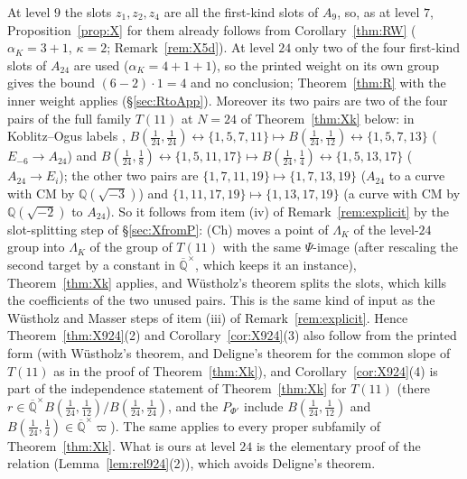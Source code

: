\documentclass[11pt]{amsart}
\theoremstyle{definition}
\newcommand{\Qb}{\overline{\mathbb{Q}}}
\newcommand{\Q}{\mathbb{Q}}
\newcommand{\vp}{\varpi}
\begin{document}
\noindent At level $9$ the slots $z_1,z_2,z_4$ are all the first-kind slots of $A_9$, so, as at level $7$,
Proposition~\ref{prop:X} for them already follows from Corollary~\ref{thm:RW} ($\alpha_K=3+1$, $\kappa=2$;
Remark~\ref{rem:X5d}). At level $24$ only two of the four first-kind slots of $A_{24}$ are used ($\alpha_K=4+1+1$), so the
printed weight on its own group gives the bound $(6-2)\cdot1=4$ and no conclusion; Theorem~\ref{thm:R} with the inner weight
applies (\S\ref{sec:RtoApp}). Moreover its two
pairs are two of the four pairs of the full family $T(11)$ at $N=24$ of Theorem~\ref{thm:Xk} below: in Koblitz--Ogus labels
\cite{KO79}, $B(\frac1{24},\frac1{24})\leftrightarrow\{1,5,7,11\}\mapsto B(\frac1{24},\frac1{12})\leftrightarrow\{1,5,7,13\}$
($E_{-6}\to A_{24}$) and $B(\frac1{24},\frac18)\leftrightarrow\{1,5,11,17\}\mapsto B(\frac1{24},\frac14)\leftrightarrow
\{1,5,13,17\}$ ($A_{24}\to E_i$); the other two pairs are $\{1,7,11,19\}\mapsto\{1,7,13,19\}$ ($A_{24}$ to a curve with CM by
$\Q(\sqrt{-3})$) and $\{1,11,17,19\}\mapsto\{1,13,17,19\}$ (a curve with CM by $\Q(\sqrt{-2})$ to $A_{24}$). So it follows
from item (iv) of Remark~\ref{rem:explicit} by the slot-splitting step of \S\ref{sec:XfromP}: (Ch) moves a point of $\Lambda_K$ of the
level-$24$ group into $\Lambda_K$ of the group of $T(11)$ with the same $\Psi$-image (after rescaling the second target by a
constant in $\Qb^\times$, which keeps it an instance), Theorem~\ref{thm:Xk} applies, and W\"ustholz's theorem splits the
slots, which kills the coefficients of the two unused pairs. This is the same kind of input as the W\"ustholz and Masser
steps of item (iii) of Remark~\ref{rem:explicit}. Hence Theorem~\ref{thm:X924}(2) and Corollary~\ref{cor:X924}(3) also
follow from the printed form \cite[Th\'eor\`eme (iii)]{RW93} (with W\"ustholz's theorem, and Deligne's theorem for the common slope of
$T(11)$ as in the proof of Theorem~\ref{thm:Xk}), and Corollary~\ref{cor:X924}(4) is part of the
independence statement of Theorem~\ref{thm:Xk} for $T(11)$ (there $r\in\Qb^\times B(\frac1{24},\frac1{12})/B(\frac1{24},
\frac1{24})$, and the $P_{\Phi'}$ include $B(\frac1{24},\frac1{12})$ and $B(\frac1{24},\frac14)\in\Qb^\times\vp$). The same
applies to every proper subfamily of Theorem~\ref{thm:Xk}. What is ours at level $24$ is the elementary proof of the
relation (Lemma~\ref{lem:rel924}(2)), which avoids Deligne's theorem.
\end{document}
